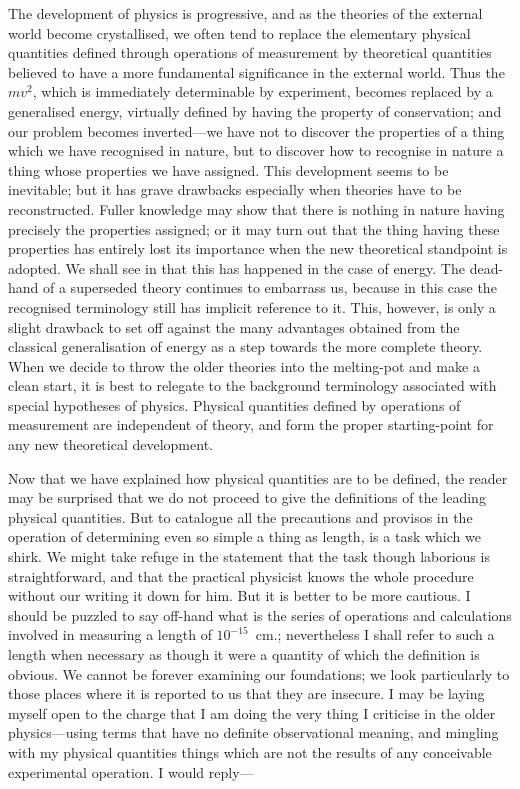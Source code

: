 \documentclass[12pt]{book}
\begin{document}
The development of physics is progressive, and as the theories of the
external world become crystallised, we often tend to replace the elementary
physical quantities defined through operations of measurement by theoretical
quantities believed to have a more fundamental significance in the external
world. Thus the  $mv^2$, which is immediately determinable by experiment,
becomes replaced by a generalised energy, virtually defined by having
the property of conservation; and our problem becomes inverted---we have
not to discover the properties of a thing which we have recognised in nature,
but to discover how to recognise in nature a thing whose properties we have
assigned. This development seems to be inevitable; but it has grave drawbacks
especially when theories have to be reconstructed. Fuller knowledge
may show that there is nothing in nature having precisely the properties
assigned; or it may turn out that the thing having these properties has
entirely lost its importance when the new theoretical standpoint is adopted\footnotemark.\footnotetext
  {We shall see in  that this has happened in the case of energy. The dead\hyp{}hand of a
  superseded theory continues to embarrass us, because in this case the recognised terminology
  still has implicit reference to it. This, however, is only a slight drawback to set off against the
  many advantages obtained from the classical generalisation of energy as a step towards the more
  complete theory.}%
When we decide to throw the older theories into the melting\hyp{}pot and make
a clean start, it is best to relegate to the background terminology associated
with special hypotheses of physics. Physical quantities defined by operations
of measurement are independent of theory, and form the proper starting\hyp{}point
for any new theoretical development.

Now that we have explained how physical quantities are to be defined,
the reader may be surprised that we do not proceed to give the definitions of
the leading physical quantities. But to catalogue all the precautions and
provisos in the operation of determining even so simple a thing as length, is
a task which we shirk. We might take refuge in the statement that the task
though laborious is straightforward, and that the practical physicist knows
the whole procedure without our writing it down for him. But it is better to
be more cautious. I should be puzzled to say off-hand what is the series of
operations and calculations involved in measuring a length of $10^{-15}$~cm.;
nevertheless I shall refer to such a length when necessary as though it were
a quantity of which the definition is obvious. We cannot be forever examining
our foundations; we look particularly to those places where it is reported to
us that they are insecure. I may be laying myself open to the charge that
I am doing the very thing I criticise in the older physics---using terms that
have no definite observational meaning, and mingling with my physical
quantities things which are not the results of any conceivable experimental
operation. I would reply---
\end{document}
